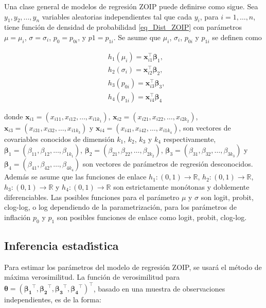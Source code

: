 Una clase general de modelos de regresi\'{o}n ZOIP puede definirse como sigue. Sea $y_1, y_2,\ldots, y_n$ variables aleatorias independientes tal que cada $y_i$, para $i=1,\ldots, n$, tiene funci\'{o}n de densidad de probabilidad \eqref{eq_Dist_ZOIP} con par\'{a}metros $\mu = \mu_i$, $\sigma=\sigma_i$,  $p_0=p_{0i}$, y $p1=p_{1i}$. Se asume que $\mu_i$, $\sigma_i$, $p_{0i}$ y $p_{1i}$ se definen como

\begin{equation}
\begin{split}
&h_1(\mu_{i})=\mathbf{x}_{i1}^{\top} \boldsymbol{\beta}_1,\\
&h_2(\sigma_{i})=\mathbf{x}_{i2}^{\top} \boldsymbol{\beta}_2,\\
&h_3(p_{0i})=\mathbf{x}_{i3}^{\top} \boldsymbol{\beta}_3,\\
&h_4(p_{1i}) =\mathbf{x}_{i4}^{\top} \boldsymbol{\beta}_4
\end{split}
\label{eq_reg}
\end{equation}

donde $\mathbf{x}_{i1}=(x_{i11}, x_{i12},\ldots, x_{i1k_1})$, $\mathbf{x}_{i2}=(x_{i21}, x_{i22},\ldots, x_{i2k_2})$, \\
$\mathbf{x}_{i3}=(x_{i31}, x_{i32},\ldots, x_{i1k_3})$ y $\mathbf{x}_{i4}=(x_{i41}, x_{i42},\ldots, x_{i1k_4})$, son vectores de covariables conocidos de dimensi\'{o}n $k_1$, $k_2$, $k_3$ y $k_4$ respectivamente, $\boldsymbol{\beta}_1=(\beta_{11}, \beta_{12},\ldots, \beta_{1k_1})$, $\boldsymbol{\beta}_2=(\beta_{21}, \beta_{22},\ldots, \beta_{2k_2})$, $\boldsymbol{\beta}_3=(\beta_{31}, \beta_{32},\ldots, \beta_{3k_3})$ y $\boldsymbol{\beta}_4=(\beta_{41}, \beta_{42},\ldots, \beta_{4k_4})$ son vectores de par\'{a}metros de regresi\'{o}n desconocidos. Adem\'{a}s se asume que las funciones de enlace $h_1:(0,1) \rightarrow \mathbb{R}$, $h_2:(0,1) \rightarrow \mathbb{R}$, $h_3:(0,1) \rightarrow \mathbb{R}$ y $h_4:(0,1) \rightarrow \mathbb{R}$ son estrictamente mon\'{o}tonas y doblemente diferenciables. Las posibles funciones para el par\'{a}metro $\mu$ y $\sigma$ son logit, probit, clog-log, o log dependiendo de la parametrizaci\'{o}n,  para los par\'{a}metros de inflaci\'{o}n $p_0$ y $p_1$ son posibles funciones de enlace como logit, probit, clog-log.

\subsection{Inferencia estad\'{\i}stica}

Para estimar los par\'{a}metros del modelo de regresi\'{o}n ZOIP, se usar\'{a} el m\'{e}todo de m\'{a}xima verosimilitud. La funci\'{o}n de verosimilitud para $\boldsymbol{\theta}=(\boldsymbol{\beta_1}^{\top},\boldsymbol{\beta_2}^{\top},\boldsymbol{\beta_3}^{\top}, \boldsymbol{\beta_4}^{\top})^{\top}$, basado en una muestra de observaciones independientes, es de la forma:

